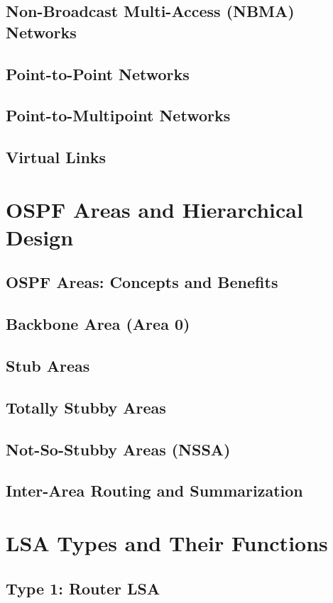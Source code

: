\documentclass{book}
\begin{document}
    \section{Non-Broadcast Multi-Access (NBMA) Networks}
    \section{Point-to-Point Networks}
    \section{Point-to-Multipoint Networks}
    \section{Virtual Links}

\chapter{OSPF Areas and Hierarchical Design}
    \section{OSPF Areas: Concepts and Benefits}
    \section{Backbone Area (Area 0)}
    \section{Stub Areas}
    \section{Totally Stubby Areas}
    \section{Not-So-Stubby Areas (NSSA)}
    \section{Inter-Area Routing and Summarization}
    
\chapter{LSA Types and Their Functions}
    \section{Type 1: Router LSA}
\end{document}
